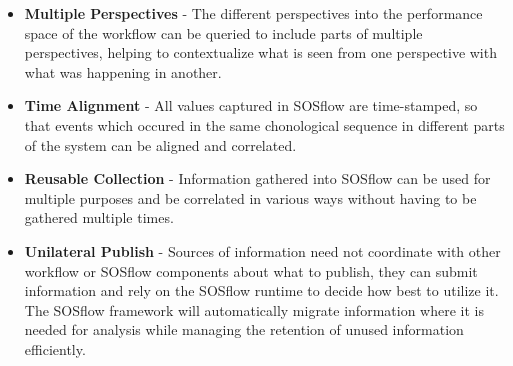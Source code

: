      \begin{itemize}
        \item \textbf{Multiple Perspectives} - The different
          perspectives into the performance space of the workflow can
          be queried to include parts of multiple
          perspectives, helping to contextualize what is seen from one
          perspective with what was happening in another.
        \item \textbf{Time Alignment} - All values captured in SOSflow
          are time-stamped, so that events which occured in the same
          chonological sequence in different parts of the system can be
          aligned and correlated.
        \item \textbf{Reusable Collection} - Information gathered into
          SOSflow can be used for multiple purposes and be correlated
          in various ways without having to be gathered multiple
          times.
        \item \textbf{Unilateral Publish} - Sources of information
          need not coordinate with other workflow or SOSflow
          components about what to publish, they can submit
          information and rely on the SOSflow runtime to decide
          how best to utilize it.
          The SOSflow framework will automatically migrate
          information where it is needed for analysis while managing
          the retention of unused information efficiently.
     \end{itemize}





